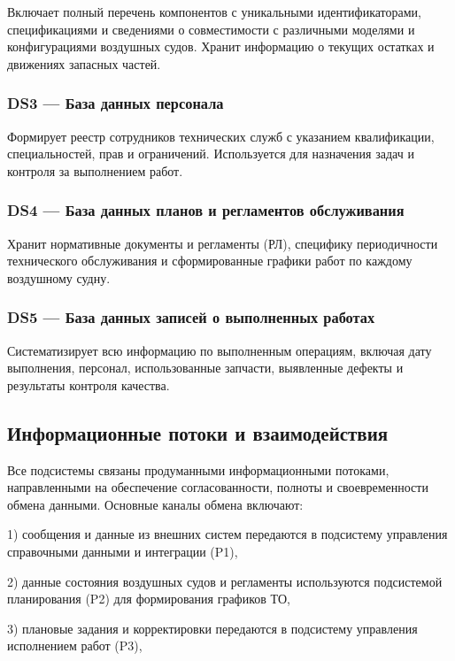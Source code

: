 \documentclass[14pt,a4paper]{extarticle}
\begin{document}
Включает полный перечень компонентов с уникальными идентификаторами, спецификациями и сведениями о совместимости с различными моделями и конфигурациями воздушных судов. Хранит информацию о текущих остатках и движениях запасных частей.

\subsubsection{DS3 — База данных персонала}

Формирует реестр сотрудников технических служб с указанием квалификации, специальностей, прав и ограничений. Используется для назначения задач и контроля за выполнением работ.

\subsubsection{DS4 — База данных планов и регламентов обслуживания}

Хранит нормативные документы и регламенты (РЛ), специфику периодичности технического обслуживания и сформированные графики работ по каждому воздушному судну.

\subsubsection{DS5 — База данных записей о выполненных работах}

Систематизирует всю информацию по выполненным операциям, включая дату выполнения, персонал, использованные запчасти, выявленные дефекты и результаты контроля качества.

\subsection{Информационные потоки и взаимодействия}

Все подсистемы связаны продуманными информационными потоками, направленными на обеспечение согласованности, полноты и своевременности обмена данными. Основные каналы обмена включают:

1) сообщения и данные из внешних систем передаются в подсистему управления справочными данными и интеграции (P1),

2) данные состояния воздушных судов и регламенты используются подсистемой планирования (P2) для формирования графиков ТО,

3) плановые задания и корректировки передаются в подсистему управления исполнением работ (P3),
\end{document}

